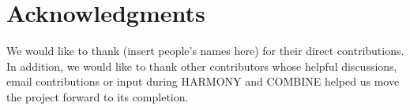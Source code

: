 
\section{Acknowledgments}

We would like to thank (insert people's names here) for their direct contributions. In addition, we would like to thank other contributors whose helpful discussions, email contributions or input during HARMONY and COMBINE helped us move the project forward to its completion.